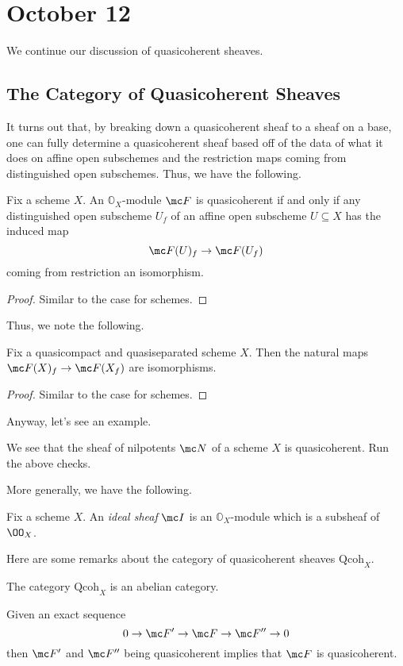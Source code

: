 \documentclass[../notes.tex]{subfiles}
\begin{document}
\section{October 12}

We continue our discussion of quasicoherent sheaves.

\subsection{The Category of Quasicoherent Sheaves}
It turns out that, by breaking down a quasicoherent sheaf to a sheaf on a base, one can fully determine a quasicoherent sheaf based off of the data of what it does on affine open subschemes and the restriction maps coming from distinguished open subschemes. Thus, we have the following.
\begin{lemma}
	Fix a scheme $X$. An $\mathbb O_X$-module $\mc F$ is quasicoherent if and only if any distinguished open subscheme $U_f$ of an affine open subscheme $U\subseteq X$ has the induced map
	\[\mc F(U)_f\to\mc F(U_f)\]
	coming from restriction an isomorphism.
\end{lemma}
\begin{proof}
	Similar to the case for schemes.
\end{proof}
Thus, we note the following.
\begin{lemma} \label{lem:localize-is-good}
	Fix a quasicompact and quasiseparated scheme $X$. Then the natural maps $\mc F(X)_f\to\mc F(X_f)$ are isomorphisms.
\end{lemma}
\begin{proof}
	Similar to the case for schemes.
\end{proof}
Anyway, let's see an example.
\begin{ex}
	We see that the sheaf of nilpotents $\mc N$ of a scheme $X$ is quasicoherent. Run the above checks.
\end{ex}
More generally, we have the following.
\begin{definition}
	Fix a scheme $X$. An \textit{ideal sheaf} $\mc I$ is an $\mathbb O_X$-module which is a subsheaf of $\OO_X$.
\end{definition}
\begin{lemma}
	Here are some remarks about the category of quasicoherent sheaves $\mathrm{Qcoh}_X$.
	\begin{listalph}
		\item The category $\mathrm{Qcoh}_X$ is an abelian category.
		\item Given an exact sequence
		\[0\to\mc F'\to\mc F\to\mc F''\to0\]
		then $\mc F'$ and $\mc F''$ being quasicoherent implies that $\mc F$ is quasicoherent.
	\end{listalph}
\end{lemma}
\end{document}
